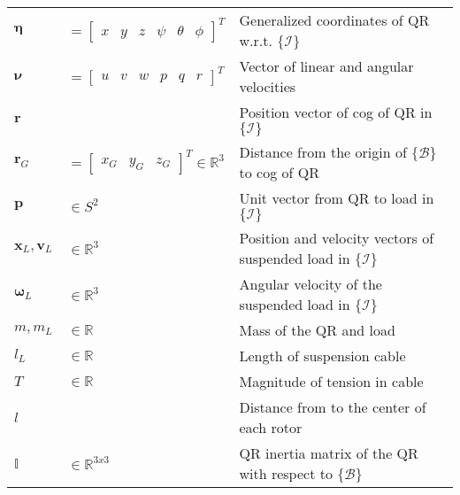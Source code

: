 \begin{tabularx}{\linewidth}{lll}
		$ \boldsymbol{\eta} $ &$= \begin{bmatrix}\!x&\!\!y&\!\!z&\!\!\psi&\!\!\theta&\!\!\phi\end{bmatrix}^T $&  Generalized coordinates of QR w.r.t. $ \{\mathcal{I}\} $ \\
		$ \boldsymbol{\nu} $&$= \begin{bmatrix}\!u&\!\!v&\!\!w&\!\!p&\!\!q&\!\!r\end{bmatrix}^T $ & Vector of linear and angular velocities\\
		$ \mathbf{r}$&&Position vector of \acs{cog} of QR in $ \{\mathcal{I}\} $\\
		$ \mathbf{r}_{G}$&$=\begin{bmatrix}\!x_G&\!\!y_G&\!\!z_G\end{bmatrix}^T  \in\mathbb{R}^3  $ & Distance from the origin of $ \{\mathcal{B}\} $ to \acs{cog} of QR\\
		$ \mathbf{p}$ & $ \in S^2 $ & Unit vector from QR to load in $ \{\mathcal{I}\} $\\
		$ \mathbf{x}_L, \mathbf{v}_L $ & $ \in \mathbb{R}^3 $ & Position and velocity vectors of suspended load in $ \{\mathcal{I}\} $\\
		$ \boldsymbol{\omega}_L $ & $ \in \mathbb{R}^3 $ & Angular velocity of the suspended load in $ \{\mathcal{I}\} $\\
		$ m, m_L $&$ \in \mathbb{R}$ & Mass of the QR and load \\
		$ l_L $&$ \in\mathbb{R} $&Length of suspension cable\\
		$ T $&$ \in\mathbb{R} $&Magnitude of tension in cable\\
		
		$ l $ && Distance from \a{cog} to the center of each rotor\\
		$\mathbb{I}$&$\in\mathbb{R}^{3x3}  $    & QR inertia matrix of the QR with respect to $ \{\mathcal{B}\}   $              \\



\end{tabularx}
